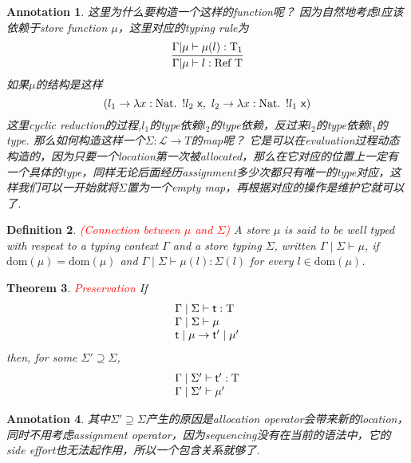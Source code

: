 \documentclass{article}
\theoremstyle{plain}
\newtheorem{theorem}{Theorem}
\newtheorem{definition}[theorem]{Definition}
\newtheorem{annotation}[theorem]{Annotation}
\theoremstyle{nonumberplain}
\newcommand{\lam}[2]{\ensuremath{\lambda #1\ldotp~ #2}} %
\newcommand{\singletype}[1]{\text{#1}}
\newcommand{\termtype}[2]{\ensuremath{#1:#2}}
\newcommand{\term}[1]{\ensuremath\mathsf{#1}}
\newcommand{\redt}[1]{\textcolor{red}{#1}}
\begin{document}
\begin{annotation}
\rm 这里为什么要构造一个这样的function呢？ 因为自然地考虑$l$应该依赖于store function $\mu$，这里对应的typing rule为
$$
\infer{\Gamma | \mu \vdash \termtype{l}{\singletype{Ref}~\singletype{T}}}{\Gamma | \mu \vdash \termtype{\mu({l})}{\singletype{T}_1}}
$$
如果$\mu$的结构是这样
$$
(l_1 \to \lam{\termtype{x}{\singletype{Nat}}}{!l_2~\term{x}},
~l_2 \to \lam{\termtype{x}{\singletype{Nat}}}{!l_1~\term{x}})
$$
这里cyclic reduction的过程,$l_1$的type依赖$l_2$的type依赖，反过来$l_2$的type依赖$l_1$的type. 那么如何构造这样一个$\Sigma\colon\mathcal{L} \to T$的map呢？ 它是可以在evaluation过程动态构造的，因为只要一个location第一次被allocated，那么在它对应的位置上一定有一个具体的type，同样无论后面经历assignment多少次都只有唯一的type对应，这样我们可以一开始就将$\Sigma$置为一个empty map，再根据对应的操作是维护它就可以了. 
\end{annotation}

\begin{definition}
\rm \redt{(Connection between $\mu$ and $\Sigma$)} A store $\mu$ is said to be well typed with respest to a typing context $\Gamma$ and a store typing $\Sigma$, written $\Gamma \mid \Sigma \vdash \mu$, if $\text{dom}(\mu) = \text{dom}(\mu)$ and $\Gamma \mid \Sigma \vdash \termtype{\mu({l})}{\Sigma(l)}$ for every $l \in \text{dom}(\mu)$. 
\end{definition}

\begin{theorem}
\rm \redt{Preservation} If 
$$
\begin{array}{lll}
\Gamma \mid \Sigma \vdash \termtype{\term{t}}{\singletype{T}} \\
\Gamma \mid \Sigma \vdash \mu  \\
\term{t} \mid \mu \to \term{t}' \mid \mu' 
\end{array}
$$
then, for some $\Sigma' \supseteq \Sigma$,
$$
\begin{array}{ll}
\Gamma \mid \Sigma' \vdash \termtype{\term{t}'}{\singletype{T}} \\
\Gamma \mid \Sigma' \vdash \mu'
\end{array}
$$
\end{theorem}

\begin{annotation}
\rm 其中$\Sigma' \supseteq \Sigma$产生的原因是allocation operator会带来新的location，同时不用考虑assignment operator，因为sequencing没有在当前的语法中，它的side effort也无法起作用，所以一个包含关系就够了. 
\end{annotation}
\end{document}
